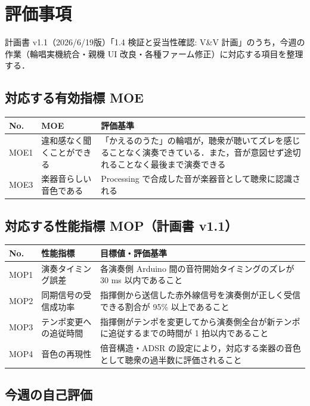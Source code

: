 \documentclass[a4paper,11pt]{ltjsarticle}
\providecommand{\％}{\%}
\begin{document}
\section{評価事項}\label{sec:evaluation}

計画書 v1.1（2026/6/19版）「1.4 検証と妥当性確認: V\&V 計画」のうち，今週の作業（輪唱実機統合・親機 UI 改良・各種ファーム修正）に対応する項目を整理する．

\subsection{対応する有効指標 MOE}\label{sec:moe}

\begin{longtable}{|p{1.2cm}|p{4cm}|p{8cm}|}
\hline
\rowcolor[gray]{0.9}
No. & MOE & 評価基準 \\
\hline
MOE1 & 違和感なく聞くことができる & 「かえるのうた」の輪唱が，聴衆が聴いてズレを感じることなく演奏できている．また，音が意図せず途切れることなく最後まで演奏できる \\
\hline
MOE3 & 楽器音らしい音色である & Processing で合成した音が楽器音として聴衆に認識される \\
\hline
\end{longtable}

\subsection{対応する性能指標 MOP（計画書 v1.1）}\label{sec:mop}

\begin{longtable}{|p{1.2cm}|p{3.8cm}|p{8.8cm}|}
\hline
\rowcolor[gray]{0.9}
No. & 性能指標 & 目標値・評価基準 \\
\hline
MOP1 & 演奏タイミング誤差 & 各演奏側 Arduino 間の音符開始タイミングのズレが 30 ms 以内であること \\
\hline
MOP2 & 同期信号の受信成功率 & 指揮側から送信した赤外線信号を演奏側が正しく受信できる割合が 95\% 以上であること \\
\hline
MOP3 & テンポ変更への追従時間 & 指揮側がテンポを変更してから演奏側全台が新テンポに追従するまでの時間が 1 拍以内であること \\
\hline
MOP4 & 音色の再現性 & 倍音構造・ADSR の設定により，対応する楽器の音色として聴衆の過半数に評価されること \\
\hline
\end{longtable}

\subsection{今週の自己評価}\label{sec:selfeval}
\end{document}
